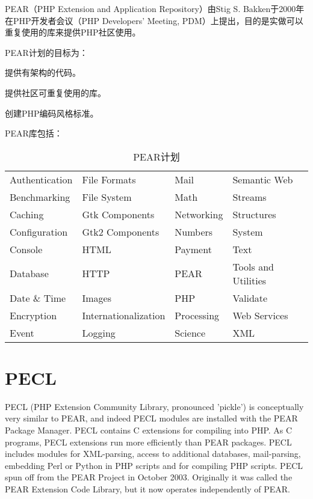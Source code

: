 PEAR（PHP Extension and Application Repository）由Stig S. Bakken于2000年在PHP开发者会议（PHP Developers' Meeting, PDM）上提出，目的是实做可以重复使用的库来提供PHP社区使用。

PEAR计划的目标为：

\begin{compactitem}
\item 提供有架构的代码。
\item 提供社区可重复使用的库。
\item 创建PHP编码风格标准。
\end{compactitem}

PEAR库包括：

\begin{table}[!ht]
\centering
\caption{PEAR计划}
\label{php_pear}
\begin{tabular}{llll}
Authentication	&File Formats		&Mail			&Semantic Web\\
Benchmarking	&File System		&Math			&Streams\\
Caching			&Gtk Components	&Networking	&Structures\\
Configuration	&Gtk2 Components	&Numbers		&System\\
Console			&HTML				&Payment		&Text\\
Database		&HTTP				&PEAR			&Tools and Utilities\\
Date \& Time	&Images			&PHP			&Validate\\
Encryption		&Internationalization&Processing	&Web Services\\
Event			&Logging			&Science		&XML\\
\end{tabular}
\end{table}



\section{PECL}


PECL (PHP Extension Community Library, pronounced 'pickle')\cite{PECL} is conceptually very similar to PEAR, and indeed PECL modules are installed with the PEAR Package Manager. PECL contains C extensions for compiling into PHP. As C programs, PECL extensions run more efficiently than PEAR packages. PECL includes modules for XML-parsing, access to additional databases, mail-parsing, embedding Perl or Python in PHP scripts and for compiling PHP scripts. PECL spun off from the PEAR Project in October 2003. Originally it was called the PEAR Extension Code Library, but it now operates independently of PEAR.

